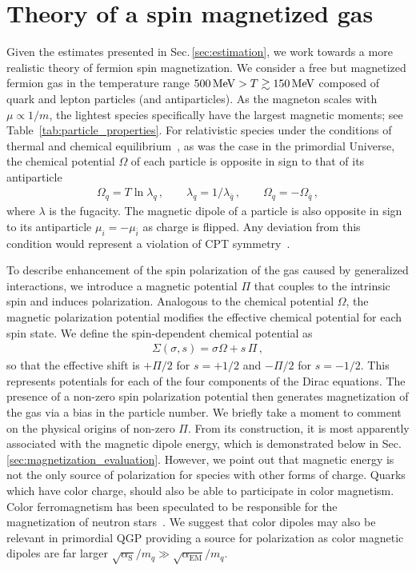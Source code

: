 \documentclass[epjST]{svjour}
\newcommand*{\MeV}{\text{\,MeV}}
\newcommand{\rsec}[1]{Sec.\,{\ref{#1}}}
\begin{document}
\section{Theory of a spin magnetized gas\label{sec:magnetization}}
{\color{blue}Given the estimates presented in \rsec{sec:estimation}, we work towards a more realistic theory of fermion spin magnetization.} We consider a free but magnetized fermion gas in the temperature range \(500\MeV>T\gtrsim150\MeV\) composed of quark and lepton particles (and antiparticles). {\color{blue}As the magneton scales with \(\mu \propto 1/m\), the lightest species specifically have the largest magnetic moments; see Table~\ref{tab:particle_properties}.} For relativistic species under the conditions of thermal and chemical equilibrium~\cite{Elze:1980er}, as was the case in the primordial Universe, the chemical potential \(\Omega\) of each particle is opposite in sign to that of its antiparticle
\begin{align}
\label{eq:equilibirum_conditions}
\Omega_{q}=T\ln\lambda_{q}\,,\qquad
\lambda_{q}=1/\lambda_{\bar{q}}\,,\qquad
\Omega_{q}=-\Omega_{\bar{q}}\,,
\end{align}
where \(\lambda\) is the fugacity. The magnetic dipole of a particle is also opposite in sign to its antiparticle \(\mu_{i}=-\mu_{\bar{i}}\) as charge is flipped. Any deviation from this condition would represent a violation of CPT {\color{blue}symmetry}~\cite{Colladay:1996iz,Bluhm:1997ci,BASE:2016yuo}.

{\color{blue}To describe enhancement of the spin polarization of the gas caused by generalized interactions, we introduce a magnetic potential \(\Pi\) that couples to the intrinsic spin and induces polarization. Analogous to the chemical potential \(\Omega\), the magnetic polarization potential modifies the effective chemical potential for each spin state. We define the spin-dependent chemical potential as
\begin{align}
\label{eq:GeneralPotential}
\Sigma(\sigma,s) = \sigma\Omega + s\,\Pi\,,
\end{align}
so that the effective shift is \(+\Pi/2\) for \(s=+1/2\) and \(-\Pi/2\) for \(s=-1/2\). This represents potentials for each of the four components of the Dirac equations. The presence of a non-zero spin polarization potential then generates magnetization of the gas via a bias in the particle number. We briefly take a moment to comment on the physical origins of non-zero \(\Pi\). From its construction, it is most apparently associated with the magnetic dipole energy, which is demonstrated below in \rsec{sec:magnetization_evaluation}. However, we point out that magnetic energy is not the only source of polarization for species with other forms of charge. Quarks which have color charge, should also be able to participate in color magnetism. Color ferromagnetism has been speculated to be responsible for the magnetization of neutron stars~\cite{Iwazaki:2005nr,Miransky:2015ava}. We suggest that color dipoles may also be relevant in primordial QGP providing a source for polarization as color magnetic dipoles are far larger \(\sqrt{\alpha_\mathrm{S}}/m_{q}\gg\sqrt{\alpha_\mathrm{EM}}/m_{q}\).}
\end{document}
